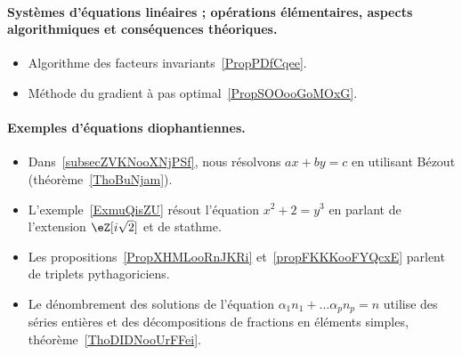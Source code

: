 \paragraph{Systèmes d'équations linéaires ; opérations élémentaires, aspects algorithmiques et conséquences théoriques.}
\begin{itemize}
    \item Algorithme des facteurs invariants~\ref{PropPDfCqee}.
    \item Méthode du gradient à pas optimal~\ref{PropSOOooGoMOxG}.
\end{itemize}
\paragraph{Exemples d’équations diophantiennes.}
\begin{itemize}
    \item Dans~\ref{subsecZVKNooXNjPSf}, nous résolvons \( ax+by=c\) en utilisant Bézout (théorème~\ref{ThoBuNjam}).
    \item L'exemple~\ref{ExmuQisZU} résout l'équation \( x^2+2=y^3\) en parlant de l'extension \( \eZ[i\sqrt{2}]\) et de stathme.
    \item Les propositions~\ref{PropXHMLooRnJKRi} et~\ref{propFKKKooFYQcxE} parlent de triplets pythagoriciens.
    \item Le dénombrement des solutions de l'équation \( \alpha_1 n_1+\ldots \alpha_pn_p=n\) utilise des séries entières et des décompositions de fractions en éléments simples, théorème~\ref{ThoDIDNooUrFFei}.
\end{itemize}
